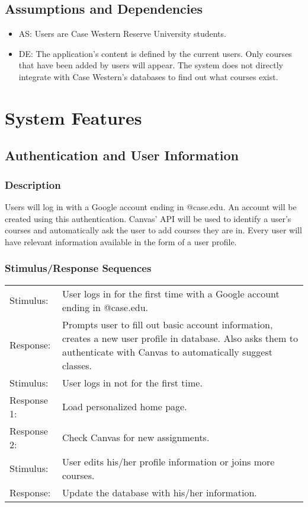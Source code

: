 \documentclass{scrreprt}
\begin{document}
\section{Assumptions and Dependencies}
\begin{itemize}
	\item AS: Users are Case Western Reserve University students.
	\item DE: The application’s content is defined by the current users. Only courses that have been added by users will appear. The system does not directly integrate with Case Western’s databases to find out what courses exist.
\end{itemize}

\chapter{System Features}

\section{Authentication and User Information}
\subsection{Description}
Users will log in with a Google account ending in @case.edu. An account will be created using this authentication. Canvas’ API will be used to identify a user's courses and automatically ask the user to add courses they are in. Every user will have relevant information available in the form of a user profile.
\subsection{Stimulus/Response Sequences}
\begin{tabular}{| p{2cm} | p{12cm} | }
	\hline
	Stimulus:   & User logs in for the first time with a Google account ending in @case.edu. \\
	Response:   & Prompts user to fill out basic account information, creates a new user profile in database. Also asks them to authenticate with Canvas to automatically suggest classes. \\ \hline
	Stimulus:   & User logs in not for the first time. \\
	Response 1: & Load personalized home page. \\
	Response 2: & Check Canvas for new assignments. \\ \hline
	Stimulus:   & User edits his/her profile information or joins more courses. \\
	Response:   & Update the database with his/her information. \\
	\hline
\end{tabular}
\end{document}

